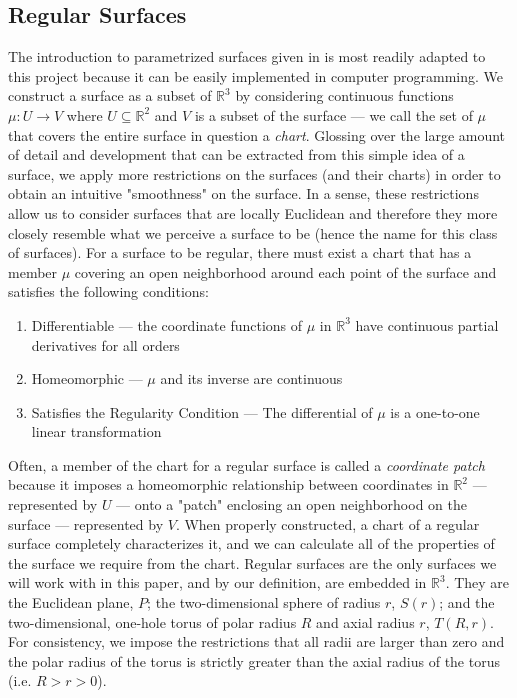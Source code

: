 \documentclass{article}
\newcommand{\R}{\mathbb{R}}
\begin{document}
	\subsection{Regular Surfaces}
		The introduction to parametrized surfaces given in \cite{BanchoffLovett_DiffGeo_2010} is most readily adapted to this project because it can be easily implemented in computer programming.
		We construct a surface as a subset of $\R^3$ by considering continuous functions $\mu:U \to V$ where $U \subseteq \R^2$ and $V$ is a subset of the surface --- we call the set of $\mu$ that covers the entire surface in question a \textit{chart}.
		Glossing over the large amount of detail and development that can be extracted from this simple idea of a surface, we apply more restrictions on the surfaces (and their charts) in order to obtain an intuitive "smoothness" on the surface.
		In a sense, these restrictions allow us to consider surfaces that are locally Euclidean and therefore they more closely resemble what we perceive a surface to be (hence the name for this class of surfaces).
		For a surface to be regular, there must exist a chart that has a member $\mu$ covering an open neighborhood around each point of the surface and satisfies the following conditions:
		\begin{enumerate}
			\item Differentiable --- the coordinate functions of $\mu$ in $\R^3$ have continuous partial derivatives for all orders
			\item Homeomorphic --- $\mu$ and its inverse are continuous
			\item Satisfies the Regularity Condition --- The differential of $\mu$ is a one-to-one linear transformation
		\end{enumerate}
		Often, a member of the chart for a regular surface is called a \textit{coordinate patch} because it imposes a homeomorphic relationship between coordinates in $\R^2$ --- represented by $U$ --- onto a "patch" enclosing an open neighborhood on the surface --- represented by $V$.
		When properly constructed, a chart of a regular surface completely characterizes it, and we can calculate all of the properties of the surface we require from the chart.
		Regular surfaces are the only surfaces we will work with in this paper, and by our definition, are embedded in $\R^3$.
		They are the Euclidean plane, $P$; the two-dimensional sphere of radius $r$, $S(r)$; and the two-dimensional, one-hole torus of polar radius $R$ and axial radius $r$, $T(R,r)$.
		For consistency, we impose the restrictions that all radii are larger than zero and the polar radius of the torus is strictly greater than the axial radius of the torus (i.e. $R > r > 0$).
	
\end{document}
